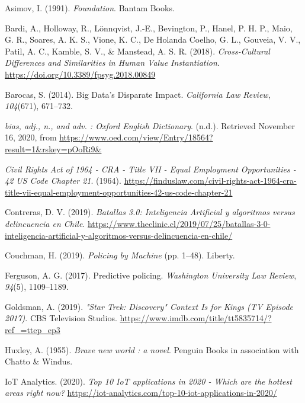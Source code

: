 \documentclass[
]{book}
\newlength{\cslhangindent}
\newenvironment{cslreferences}%
  {\setlength{\parindent}{0pt}%
  \everypar{\setlength{\hangindent}{\cslhangindent}}\ignorespaces}%
  {\par}
\begin{document}
\hypertarget{refs}{}
\begin{cslreferences}
\leavevmode\hypertarget{ref-asimov1991foundation}{}%
Asimov, I. (1991). \emph{Foundation}. Bantam Books.

\leavevmode\hypertarget{ref-Bardi2018}{}%
Bardi, A., Holloway, R., Lönnqvist, J.-E., Bevington, P., Hanel, P. H. P., Maio, G. R., Soares, A. K. S., Vione, K. C., De Holanda Coelho, G. L., Gouveia, V. V., Patil, A. C., Kamble, S. V., \& Manstead, A. S. R. (2018). \emph{Cross-Cultural Differences and Similarities in Human Value Instantiation}. \url{https://doi.org/10.3389/fpsyg.2018.00849}

\leavevmode\hypertarget{ref-Barocas2014}{}%
Barocas, S. (2014). Big Data's Disparate Impact. \emph{California Law Review}, \emph{104}(671), 671--732.

\leavevmode\hypertarget{ref-OED-bias}{}%
\emph{bias, adj., n., and adv. : Oxford English Dictionary}. (n.d.). Retrieved November 16, 2020, from \url{https://www.oed.com/view/Entry/18564?result=1\&rskey=pOoRi9\&}

\leavevmode\hypertarget{ref-TitleVii1964}{}%
\emph{Civil Rights Act of 1964 - CRA - Title VII - Equal Employment Opportunities - 42 US Code Chapter 21}. (1964). \url{https://finduslaw.com/civil-rights-act-1964-cra-title-vii-equal-employment-opportunities-42-us-code-chapter-21}

\leavevmode\hypertarget{ref-Contreras2019}{}%
Contreras, D. V. (2019). \emph{Batallas 3.0: Inteligencia Artificial y algoritmos versus delincuencia en Chile}. \url{https://www.theclinic.cl/2019/07/25/batallas-3-0-inteligencia-artificial-y-algoritmos-versus-delincuencia-en-chile/}

\leavevmode\hypertarget{ref-Couchman2019}{}%
Couchman, H. (2019). \emph{Policing by Machine} (pp. 1--48). Liberty.

\leavevmode\hypertarget{ref-Ferguson2017}{}%
Ferguson, A. G. (2017). Predictive policing. \emph{Washington University Law Review}, \emph{94}(5), 1109--1189.

\leavevmode\hypertarget{ref-Goldsman2019}{}%
Goldsman, A. (2019). \emph{"Star Trek: Discovery" Context Is for Kings (TV Episode 2017)}. CBS Television Studios. \url{https://www.imdb.com/title/tt5835714/?ref_=ttep_ep3}

\leavevmode\hypertarget{ref-Huxley1955}{}%
Huxley, A. (1955). \emph{Brave new world : a novel}. Penguin Books in association with Chatto \& Windus.

\leavevmode\hypertarget{ref-IoTAnalytics2020}{}%
IoT Analytics. (2020). \emph{Top 10 IoT applications in 2020 - Which are the hottest areas right now?} \url{https://iot-analytics.com/top-10-iot-applications-in-2020/}


\end{cslreferences}
\end{document}
